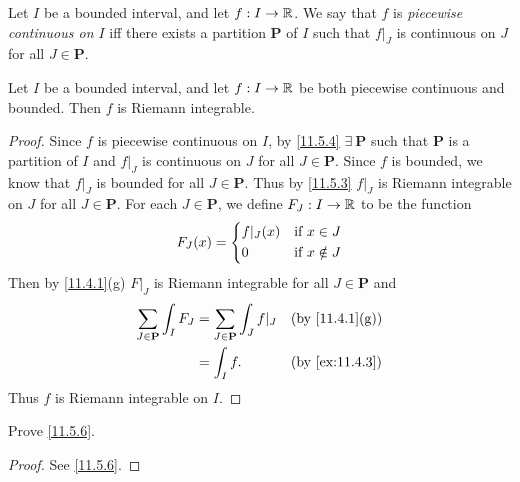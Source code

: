 \begin{defn}\label{11.5.4}
  Let \(I\) be a bounded interval, and let \(f : I \to \mathbb{R}\).
  We say that \(f\) is \emph{piecewise continuous on \(I\)} iff there exists a partition \(\mathbf{P}\) of \(I\) such that \(f|_J\) is continuous on \(J\) for all \(J \in \mathbf{P}\).
\end{defn}

\setcounter{thm}{5}
\begin{prop}\label{11.5.6}
  Let \(I\) be a bounded interval, and let \(f : I \to \mathbb{R}\) be both piecewise continuous and bounded.
  Then \(f\) is Riemann integrable.
\end{prop}

\begin{proof}
  Since \(f\) is piecewise continuous on \(I\), by \cref{11.5.4} \(\exists\ \mathbf{P}\) such that \(\mathbf{P}\) is a partition of \(I\) and \(f|_J\) is continuous on \(J\) for all \(J \in \mathbf{P}\).
  Since \(f\) is bounded, we know that \(f|_J\) is bounded for all \(J \in \mathbf{P}\).
  Thus by \cref{11.5.3} \(f|_J\) is Riemann integrable on \(J\) for all \(J \in \mathbf{P}\).
  For each \(J \in \mathbf{P}\), we define \(F_J : I \to \mathbb{R}\) to be the function
  \[
    F_J(x) = \begin{dcases}
      f|_J(x) & \text{if } x \in J    \\
      0       & \text{if } x \notin J
    \end{dcases}
  \]
  Then by \cref{11.4.1}(g) \(F|_J\) is Riemann integrable for all \(J \in \mathbf{P}\) and
  \begin{align*}
    \sum_{J \in \mathbf{P}} \int_I F_J & = \sum_{J \in \mathbf{P}} \int_J f|_J &  & \text{(by \cref{11.4.1}(g))} \\
                                       & = \int_I f.                           &  & \text{(by \cref{ex:11.4.3})}
  \end{align*}
  Thus \(f\) is Riemann integrable on \(I\).
\end{proof}

\exercisesection

\begin{ex}\label{ex:11.5.1}
  Prove \cref{11.5.6}.
\end{ex}

\begin{proof}
  See \cref{11.5.6}.
\end{proof}